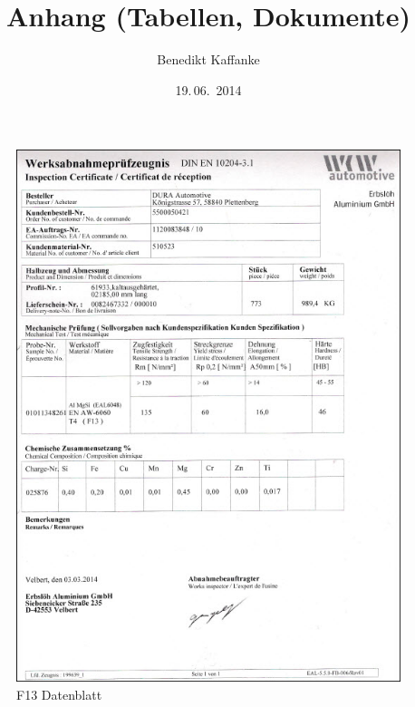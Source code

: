 \documentclass[12pt,a4paper,parskip]{scrartcl}
\begin{document}
\author{Benedikt Kaffanke}
\title{Anhang (Tabellen, Dokumente)}
\date{19.\,06.~2014}
\maketitle
\listoffigures
\begin{figure}[hbtp]
\centering
\includegraphics[width=.8\textwidth]{F13Datenblatt.jpg}
\caption{F13 Datenblatt}
\end{figure}
\end{document}
